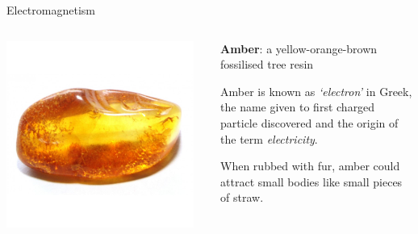 \begin{frame}{Electromagnetism}

\begin{columns}
  \begin{column}{0.35\textwidth}
   \begin{center}
      \includegraphics[width=0.95\textwidth]{./images/photos/amber_stone_1.jpg}\\
   \end{center}
  \end{column}
  \begin{column}{0.65\textwidth}
   \begin{itemize}
   {\small
    \item {\bf Amber}: a yellow-orange-brown fossilised tree resin
     \begin{itemize}
     {\scriptsize
        \item Amber is known as {\em `electron'} in Greek, the name given to first
              charged particle discovered and the origin of the term {\em electricity}.
     }
     \end{itemize}
     \item When rubbed with fur, amber could attract small bodies like small pieces of straw.
   }
   \end{itemize}
  \end{column}
\end{columns}


\end{frame}
